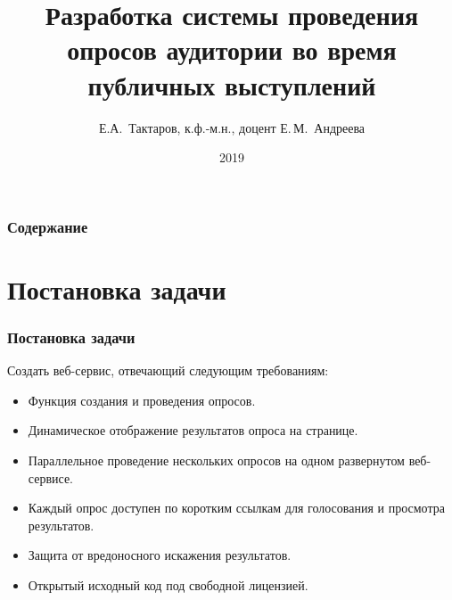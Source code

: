 \documentclass{beamer}
\title[Выпускная квалификационная работа]{Разработка системы проведения опросов аудитории во время публичных выступлений} %
\author{Е.А.~Тактаров, к.ф.-м.н., доцент Е.\,М.~Андреева} %
\institute[ИММиКН] %
{
Институт математики, механики и компьютерных наук им. И.И. Воровича  \\ %
Южный Федеральный Университет
}
\date{2019} %
\begin{document}
\begin{frame}
\titlepage %
\end{frame}

\begin{frame}
\frametitle{Содержание} %
\tableofcontents %
\end{frame}


\section{Постановка задачи}
\begin{frame}
\frametitle{Постановка задачи}
Создать веб-сервис, отвечающий следующим требованиям:
\begin{itemize}
	\item Функция создания и проведения опросов. 
	\item Динамическое отображение результатов опроса на странице.
	\item Параллельное проведение нескольких опросов на одном развернутом веб-сервисе.
	\item Каждый опрос доступен по коротким ссылкам для голосования и просмотра результатов.
	\item Защита от вредоносного искажения результатов. 
	\item Открытый исходный код под свободной лицензией.
\end{itemize}
\end{frame}

\end{document}
